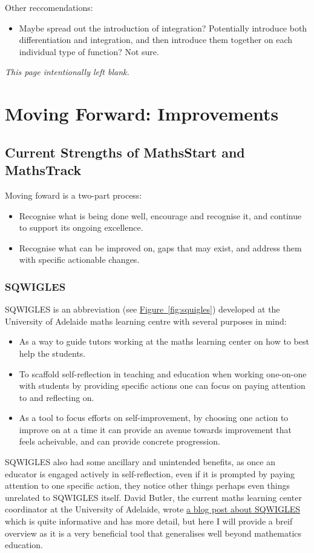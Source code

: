 \documentclass[twoside,12pt,a4paper]{report}
\makeatletter
\newcommand*{\intentionallyblankpage}{
  \vspace*{\fill}
  {\centering \textit{This page intentionally left blank.} \par}
  \vspace{\fill}}
\renewcommand*{\cleardoublepage}{\clearpage\if@twoside \ifodd\c@page\else
  \intentionallyblankpage
  \newpage
  \if@twocolumn\hbox{}\newpage\fi\fi\fi}
\newcommand{\reffig}[1]{\hyperref[fig:#1]{Figure~\ref{fig:#1}}}
\makeatother
\begin{document}
Other reccomendations:
\begin{itemize}
	\item Maybe spread out the introduction of integration? Potentially introduce both differentiation and integration, and then introduce them together on each individual type of function? Not sure.
\end{itemize}


\cleardoublepage
\chapter{Moving Forward: Improvements} 
\label{chap:recommendations}

\section{Current Strengths of MathsStart and MathsTrack}

Moving foward is a two-part process:
\begin{itemize}
	\item Recognise what is being done well, encourage and recognise it, and continue to support its ongoing excellence.
	\item Recognise what can be improved on, gaps that may exist, and address them with specific actionable changes.
\end{itemize}

\subsection{SQWIGLES}

SQWIGLES is an abbreviation (see \reffig{squigles}) developed at the University of Adelaide maths learning centre with several purposes in mind:
\begin{itemize}
	\item As a way to guide tutors working at the maths learning center on how to best help the students.
	\item To scaffold self-reflection in teaching and education when working one-on-one with students by providing specific actions one can focus on paying attention to and reflecting on.
	\item As a tool to focus efforts on self-improvement, by choosing one action to improve on at a time it can provide an avenue towards improvement that feels acheivable, and can provide concrete progression.
\end{itemize}
SQWIGLES also had some ancillary and unintended benefits, as once an educator is engaged actively in self-reflection, even if it is prompted by paying attention to one specific action, they notice other things perhaps even things unrelated to SQWIGLES itself. David Butler, the current maths learning center coordinator at the University of Adelaide, wrote \href{https://blogs.adelaide.edu.au/maths-learning/2016/09/20/sqwigles/}{a blog post about SQWIGLES} which is quite informative and has more detail, but here I will provide a breif overview as it is a very beneficial tool that generalises well beyond mathematics education.
\end{document}

